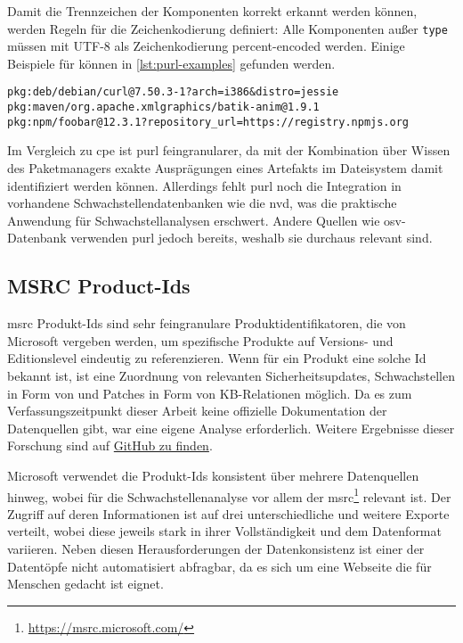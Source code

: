 Damit die Trennzeichen der Komponenten korrekt erkannt werden können, werden Regeln für die Zeichenkodierung definiert: Alle Komponenten außer \texttt{type} müssen mit UTF-8 als Zeichenkodierung percent-encoded werden.
Einige Beispiele für  können in \autoref{lst:purl-examples} gefunden werden.

\begin{lstlisting}[caption=Beispielhafte PURLs verschiedener Pakettypen,label=lst:purl-examples]
pkg:deb/debian/curl@7.50.3-1?arch=i386&distro=jessie
pkg:maven/org.apache.xmlgraphics/batik-anim@1.9.1
pkg:npm/foobar@12.3.1?repository_url=https://registry.npmjs.org
\end{lstlisting}

Im Vergleich zu \acrshort{cpe} ist \acrshort{purl} feingranularer, da mit der Kombination über Wissen des Paketmanagers exakte Ausprägungen eines Artefakts im Dateisystem damit identifiziert werden können.
Allerdings fehlt \acrshort{purl} noch die Integration in vorhandene Schwachstellendatenbanken wie die \acrshort{nvd}, was die praktische Anwendung für Schwachstellanalysen erschwert.
Andere Quellen wie \acrshort{osv}-Datenbank verwenden \acrshort{purl} jedoch bereits, weshalb sie durchaus relevant sind.

\subsection{MSRC Product-Ids}\label{subsec:msrc-product-ids}

\acrshort{msrc} Produkt-Ids sind sehr feingranulare Produktidentifikatoren, die von Microsoft vergeben werden, um spezifische Produkte auf Versions- und Editionslevel eindeutig zu referenzieren.
Wenn für ein Produkt eine solche Id bekannt ist, ist eine Zuordnung von relevanten Sicherheitsupdates, Schwachstellen in Form von  und Patches in Form von KB-Relationen möglich.
Da es zum Verfassungszeitpunkt dieser Arbeit keine offizielle Dokumentation der Datenquellen gibt, war eine eigene Analyse erforderlich.
Weitere Ergebnisse dieser Forschung sind auf \href{https://web.archive.org/web/20250706140027/https://github.com/org-metaeffekt/metaeffekt-documentation/blob/main/metaeffekt-vulnerability-management/data-mirror/msrc/understanding-data.md}{GitHub zu finden}.

Microsoft verwendet die Produkt-Ids konsistent über mehrere Datenquellen hinweg, wobei für die Schwachstellenanalyse vor allem der \acrfull{msrc}\footnote{\url{https://msrc.microsoft.com/}} relevant ist.
Der Zugriff auf deren Informationen ist auf drei unterschiedliche  und weitere Exporte verteilt, wobei diese jeweils stark in ihrer Vollständigkeit und dem Datenformat variieren.
Neben diesen Herausforderungen der Datenkonsistenz ist einer der Datentöpfe nicht automatisiert abfragbar, da es sich um eine Webseite die für Menschen gedacht ist eignet.

